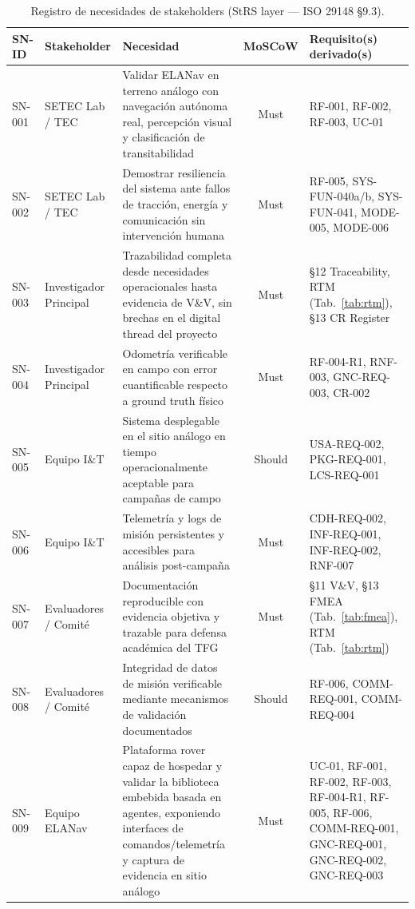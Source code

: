 \begin{table}[H]
\centering
\scriptsize
\begin{tabularx}{\textwidth}{| l | l | X | c | p{3.8cm} |}
\hline
\textbf{SN-ID} & \textbf{Stakeholder} & \textbf{Necesidad} & \textbf{MoSCoW} & \textbf{Requisito(s) derivado(s)} \\ \hline

SN-001 & SETEC Lab / TEC &
Validar ELANav en terreno análogo con navegación autónoma real, percepción visual y clasificación de transitabilidad &
Must &
RF-001, RF-002, RF-003, UC-01 \\ \hline

SN-002 & SETEC Lab / TEC &
Demostrar resiliencia del sistema ante fallos de tracción, energía y comunicación sin intervención humana &
Must &
RF-005, SYS-FUN-040a/b, SYS-FUN-041, MODE-005, MODE-006 \\ \hline

SN-003 & Investigador Principal &
Trazabilidad completa desde necesidades operacionales hasta evidencia de V\&V, sin brechas en el digital thread del proyecto &
Must &
§12 Traceability, RTM (Tab.~\ref{tab:rtm}), §13 CR Register \\ \hline

SN-004 & Investigador Principal &
Odometría verificable en campo con error cuantificable respecto a ground truth físico &
Must &
RF-004-R1, RNF-003, GNC-REQ-003, CR-002 \\ \hline

SN-005 & Equipo I\&T &
Sistema desplegable en el sitio análogo en tiempo operacionalmente aceptable para campañas de campo &
Should &
USA-REQ-002, PKG-REQ-001, LCS-REQ-001 \\ \hline

SN-006 & Equipo I\&T &
Telemetría y logs de misión persistentes y accesibles para análisis post-campaña &
Must &
CDH-REQ-002, INF-REQ-001, INF-REQ-002, RNF-007 \\ \hline

SN-007 & Evaluadores / Comité &
Documentación reproducible con evidencia objetiva y trazable para defensa académica del TFG &
Must &
§11 V\&V, §13 FMEA (Tab.~\ref{tab:fmea}), RTM (Tab.~\ref{tab:rtm}) \\ \hline

SN-008 & Evaluadores / Comité &
Integridad de datos de misión verificable mediante mecanismos de validación documentados &
Should &
RF-006, COMM-REQ-001, COMM-REQ-004 \\ \hline

SN-009 & Equipo ELANav &
Plataforma rover capaz de hospedar y validar la biblioteca embebida basada en agentes, exponiendo interfaces de comandos/telemetría y captura de evidencia en sitio análogo &
Must &
UC-01, RF-001, RF-002, RF-003, RF-004-R1, RF-005, RF-006, COMM-REQ-001, GNC-REQ-001, GNC-REQ-002, GNC-REQ-003 \\ \hline

\end{tabularx}
\caption{Registro de necesidades de stakeholders (StRS layer — ISO 29148 §9.3).}
\label{tab:sn_register}
\end{table}

